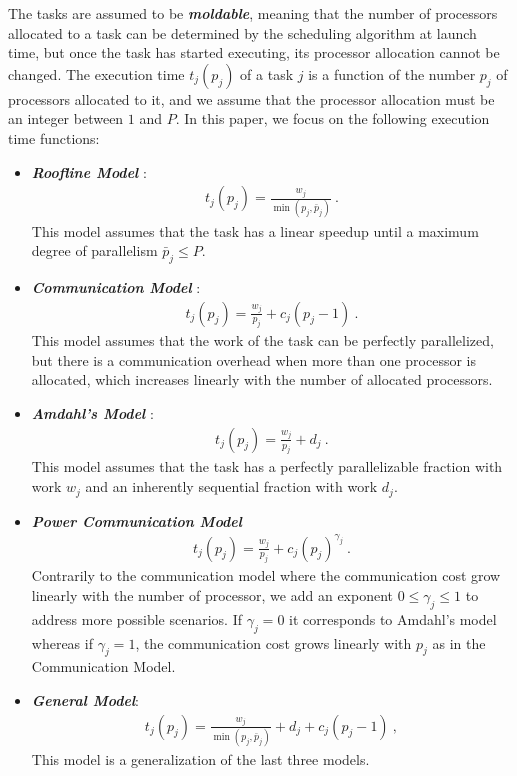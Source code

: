 \documentclass{article}
\begin{document}
The tasks are assumed to be \textbf{\emph{moldable}}, meaning that the number of processors allocated to a task can be determined by the scheduling algorithm at launch time, but once the task has started executing, its processor allocation cannot be changed. The execution time $t_j(p_j)$ of a task $j$ is a function of the number $p_j$ of processors allocated to it, and we assume that the processor allocation must be an integer between $1$ and $P$. In this paper, we focus on the following execution time functions:
\begin{itemize}
\item \emph{\textbf{Roofline Model}} \cite{Williams2009}:
\begin{align}
\label{eq.model.roof}
t_j(p_j) = \frac{w_j}{\min(p_j, \bar{p}_j)} \ .
\end{align}
This model assumes that the task has a linear speedup until a maximum degree of parallelism $\bar{p}_j \le P$.
\item \emph{\textbf{Communication Model}} \cite{Havill08_SET}:
\begin{align}
\label{eq.model.comm}
t_j(p_j) = \frac{w_j}{p_j} + c_j (p_j - 1) \ .
\end{align}
This model assumes that the work of the task can be perfectly parallelized, but there is a communication overhead when more than one processor is allocated, which increases linearly with the number of allocated processors.


\item \emph{\textbf{Amdahl's Model}} \cite{Amdahl67}:
\begin{align}
\label{eq.model.amdahl}
t_j(p_j) = \frac{w_j}{p_j} + d_j \ .
\end{align}
This model assumes that the task has a perfectly parallelizable fraction with work $w_j$ and an inherently sequential fraction with work $d_j$.


\item \emph{\textbf{Power Communication Model}}
\begin{align}
\label{eq.model.powcomm}
t_j(p_j) = \frac{w_j}{p_j} + c_j (p_j)^{\gamma_j} \ .
\end{align}
Contrarily to the communication model where the communication cost grow linearly with the number of processor, we add an exponent $0 \leq \gamma_j \leq 1$ to address more possible scenarios. If $\gamma_j=0$ it corresponds to Amdahl's model whereas if $\gamma_j=1$, the communication cost grows linearly with $p_j$ as in the Communication Model.

\item \emph{\textbf{General Model}}:
\begin{align}
\label{eq.exec_time}
t_j(p_j) = \frac{w_j}{\min(p_j, \bar{p}_j)} + d_j + c_j (p_j - 1) \ ,
\end{align}
This model is a generalization of the last three models.
\end{itemize}
\end{document}
